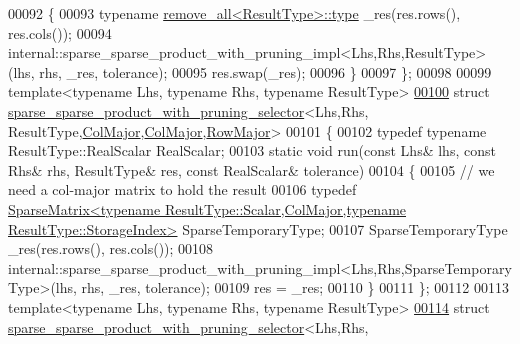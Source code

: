 \begin{DoxyCode}
00092   \{
00093     \textcolor{keyword}{typename} \hyperlink{group___sparse_core___module}{remove\_all<ResultType>::type} \_res(res.rows(), res.cols());
00094     internal::sparse\_sparse\_product\_with\_pruning\_impl<Lhs,Rhs,ResultType>(lhs, rhs, \_res, tolerance);
00095     res.swap(\_res);
00096   \}
00097 \};
00098 
00099 \textcolor{keyword}{template}<\textcolor{keyword}{typename} Lhs, \textcolor{keyword}{typename} Rhs, \textcolor{keyword}{typename} ResultType>
\hyperlink{struct_eigen_1_1internal_1_1sparse__sparse__product__with__pruning__selector_3_01_lhs_00_01_rhs_21e1c567bb33db704730c4eb2830e598}{00100} \textcolor{keyword}{struct }\hyperlink{struct_eigen_1_1internal_1_1sparse__sparse__product__with__pruning__selector}{sparse\_sparse\_product\_with\_pruning\_selector}<Lhs,Rhs,
      ResultType,\hyperlink{group__enums_ggaacded1a18ae58b0f554751f6cdf9eb13a0cbd4bdd0abcfc0224c5fcb5e4f6669a}{ColMajor},\hyperlink{group__enums_ggaacded1a18ae58b0f554751f6cdf9eb13a0cbd4bdd0abcfc0224c5fcb5e4f6669a}{ColMajor},\hyperlink{group__enums_ggaacded1a18ae58b0f554751f6cdf9eb13acfcde9cd8677c5f7caf6bd603666aae3}{RowMajor}>
00101 \{
00102   \textcolor{keyword}{typedef} \textcolor{keyword}{typename} ResultType::RealScalar RealScalar;
00103   \textcolor{keyword}{static} \textcolor{keywordtype}{void} run(\textcolor{keyword}{const} Lhs& lhs, \textcolor{keyword}{const} Rhs& rhs, ResultType& res, \textcolor{keyword}{const} RealScalar& tolerance)
00104   \{
00105     \textcolor{comment}{// we need a col-major matrix to hold the result}
00106     \textcolor{keyword}{typedef} 
      \hyperlink{group___sparse_core___module_class_eigen_1_1_sparse_matrix}{SparseMatrix<typename ResultType::Scalar,ColMajor,typename ResultType::StorageIndex>}
       SparseTemporaryType;
00107     SparseTemporaryType \_res(res.rows(), res.cols());
00108     internal::sparse\_sparse\_product\_with\_pruning\_impl<Lhs,Rhs,SparseTemporaryType>(lhs, rhs, \_res, 
      tolerance);
00109     res = \_res;
00110   \}
00111 \};
00112 
00113 \textcolor{keyword}{template}<\textcolor{keyword}{typename} Lhs, \textcolor{keyword}{typename} Rhs, \textcolor{keyword}{typename} ResultType>
\hyperlink{struct_eigen_1_1internal_1_1sparse__sparse__product__with__pruning__selector_3_01_lhs_00_01_rhs_ac6a83f16fa8af56c1b06b928dbc0536}{00114} \textcolor{keyword}{struct }\hyperlink{struct_eigen_1_1internal_1_1sparse__sparse__product__with__pruning__selector}{sparse\_sparse\_product\_with\_pruning\_selector}<Lhs,Rhs,

\end{DoxyCode}
